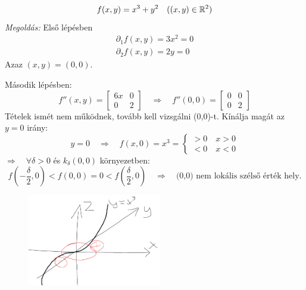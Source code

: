 \documentclass[a4paper,11.5pt]{article}
\begin{document}
	\begin{task}
		\[ f(x,y)=x^3+y^2\quad ((x,y)\in\mathbb{R}^2) \]
		\textit{Megoldás:} Első lépésben
		\begin{align*}
			\partial_1f(x,y)=3x^2=0\\
			\partial_2f(x,y)=2y=0
		\end{align*}
		Azaz $(x,y)=(0,0)$.
		
		Második lépésben:
		\[ f''(x,y)=\begin{bmatrix}
			6x&0\\
			0&2
		\end{bmatrix}\quad \Rightarrow\quad f''(0,0)=\begin{bmatrix}
			0&0\\
			0&2
		\end{bmatrix} \]
		Tételek ismét nem működnek, tovább kell vizsgálni (0,0)-t. Kínálja magát az $y=0$ irány:
		\[ y=0\quad \Rightarrow\quad f(x,0)=x^3=\begin{cases}
			>0\quad x>0\\
			<0\quad x<0
		\end{cases} \]
		$\Rightarrow\quad \forall\delta>0$ és $k_\delta(0,0)$ környezetben:
		\[ f\left(-\frac{\delta}{2},0\right)<f(0,0)=0<f\left(\frac{\delta}{2},0\right)\quad \Rightarrow\quad \text{(0,0) nem lokális szélső érték hely.} \]
		\begin{figure}[H]
			\centering
			\includegraphics[height=4cm]{../2zh/kepek/45.png}
			\caption{}
		\end{figure}
	\end{task}
\end{document}
